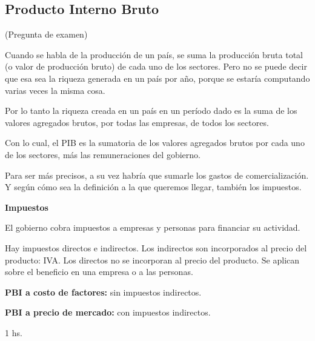 \subsection{Producto Interno Bruto}

(Pregunta de examen)

Cuando se habla de la producción de un país,
se suma la producción bruta total (o valor de producción bruto) 
de cada uno de los sectores. 
Pero no se puede decir que esa sea la riqueza generada en un país por año,
porque se estaría computando varias veces la misma cosa.

Por lo tanto la riqueza creada en un país en un período dado es la suma de los 
valores agregados brutos, por todas las empresas, de todos los sectores.

Con lo cual, 
el PIB es la sumatoria de los valores agregados brutos 
por cada uno de los sectores,
más las remuneraciones del gobierno.

Para ser más precisos,
a su vez habría que sumarle los gastos de comercialización.
Y según cómo sea la definición a la que queremos llegar,
también los impuestos.

\textbf{Impuestos}

El gobierno cobra impuestos a empresas y personas para financiar su actividad.

Hay impuestos directos e indirectos.
Los indirectos son incorporados al precio del producto: IVA.
Los directos no se incorporan al precio del producto.
Se aplican sobre el beneficio en una empresa o a las personas.

\textbf{PBI a costo de factores:} sin impuestos indirectos.

\textbf{PBI a precio de mercado:} con impuestos indirectos.

1 hs.